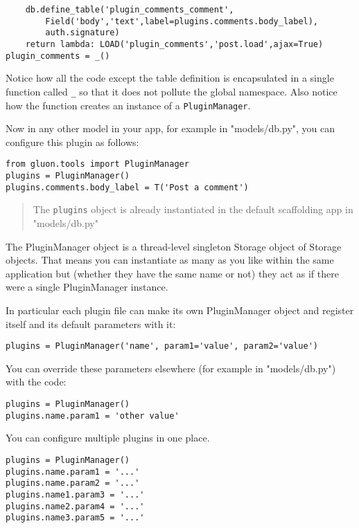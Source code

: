 \documentclass[justified,sixbynine,notoc]{tufte-book}
\def\ft{\small\tt}
\begin{document}
\begin{fullwidth}
\begin{lstlisting}
    db.define_table('plugin_comments_comment',
        Field('body','text',label=plugins.comments.body_label),
        auth.signature)
    return lambda: LOAD('plugin_comments','post.load',ajax=True)
plugin_comments = _()
\end{lstlisting}

Notice how all the code except the table definition is encapsulated in a single function called {\ft \_} so that it does not pollute the global namespace. Also notice how the function creates an instance of a {\ft PluginManager}.

Now in any other model in your app, for example in "models/db.py", you can configure this plugin as follows:

\begin{lstlisting}
from gluon.tools import PluginManager
plugins = PluginManager()
plugins.comments.body_label = T('Post a comment')
\end{lstlisting}

\begin{quote}The {\ft plugins} object is already instantiated in the default scaffolding app in "models/db.py"\end{quote}
The PluginManager object is a thread-level singleton Storage object of Storage objects. That means you can instantiate as many as you like within the same application but (whether they have the same name or not) they act as if there were a single PluginManager instance.

In particular each plugin file can make its own PluginManager object and register itself and its default parameters with it:

\begin{lstlisting}
plugins = PluginManager('name', param1='value', param2='value')
\end{lstlisting}

You can override these parameters elsewhere (for example in "models/db.py") with the code:

\begin{lstlisting}
plugins = PluginManager()
plugins.name.param1 = 'other value'
\end{lstlisting}

You can configure multiple plugins in one place.

\begin{lstlisting}
plugins = PluginManager()
plugins.name.param1 = '...'
plugins.name.param2 = '...'
plugins.name1.param3 = '...'
plugins.name2.param4 = '...'
plugins.name3.param5 = '...'
\end{lstlisting}


\end{fullwidth}
\end{document}
